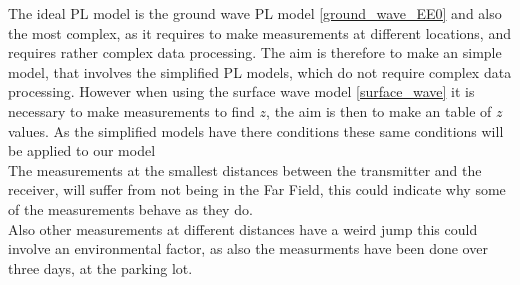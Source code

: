 The ideal PL model is the ground wave PL model \eqref{ground_wave_EE0} and also the most complex, as it requires to make measurements at different locations, and requires rather complex data processing. The aim is therefore to make an simple model, that involves the simplified PL models, which do not require complex data processing. However when using the surface wave model \eqref{surface_wave} it is necessary to make measurements to find $z$, the aim is then to make an table of $z$ values. As the simplified models have there conditions these same conditions will be applied to our model \\


The measurements at the smallest distances between the transmitter and the receiver, will suffer from not being in the Far Field, this could indicate why some of the measurements behave as they do. \\

Also other measurements at different distances have a weird jump this could involve an environmental factor, as also the measurments have been done over three days, at the parking lot. 
     
